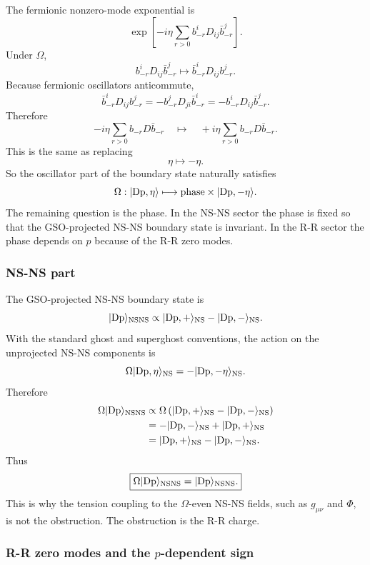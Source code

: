 \documentclass[
  10pt,
  a4paper,
  openany]{book}
\begin{document}
The fermionic nonzero-mode exponential is \[
\exp\left[
-i\eta
\sum_{r>0}
b_{-r}^iD_{ij}\bar b_{-r}^j
\right].
\] Under \(\Omega\), \[
b_{-r}^iD_{ij}\bar b_{-r}^j
\longmapsto
\bar b_{-r}^iD_{ij}b_{-r}^j.
\] Because fermionic oscillators anticommute, \[
\bar b_{-r}^iD_{ij}b_{-r}^j
=
-
b_{-r}^jD_{ji}\bar b_{-r}^i
=
-
b_{-r}^iD_{ij}\bar b_{-r}^j.
\] Therefore \[
-i\eta
\sum_{r>0}
b_{-r}D\bar b_{-r}
\quad
\longmapsto
\quad
+i\eta
\sum_{r>0}
b_{-r}D\bar b_{-r}.
\] This is the same as replacing \[
\eta\mapsto -\eta.
\] So the oscillator part of the boundary state naturally satisfies \[
\Omega:
|{\rm Dp},\eta\rangle
\longmapsto
\text{phase}\times
|{\rm Dp},-\eta\rangle.
\] The remaining question is the phase. In the NS-NS sector the phase is
fixed so that the GSO-projected NS-NS boundary state is invariant. In
the R-R sector the phase depends on \(p\) because of the R-R zero modes.

\subsubsection{NS-NS part}\label{ns-ns-part}

The GSO-projected NS-NS boundary state is \[
|{\rm Dp}\rangle_{\mathrm{NSNS}}
\propto
|{\rm Dp},+\rangle_{\mathrm{NS}}
-
|{\rm Dp},-\rangle_{\mathrm{NS}}.
\] With the standard ghost and superghost conventions, the action on the
unprojected NS-NS components is \[
\Omega |{\rm Dp},\eta\rangle_{\mathrm{NS}}
=
-
|{\rm Dp},-\eta\rangle_{\mathrm{NS}}.
\] Therefore \[
\begin{aligned}
\Omega |{\rm Dp}\rangle_{\mathrm{NSNS}}
&\propto
\Omega
\left(
|{\rm Dp},+\rangle_{\mathrm{NS}}
-
|{\rm Dp},-\rangle_{\mathrm{NS}}
\right)\\
&=
-
|{\rm Dp},-\rangle_{\mathrm{NS}}
+
|{\rm Dp},+\rangle_{\mathrm{NS}}\\
&=
|{\rm Dp},+\rangle_{\mathrm{NS}}
-
|{\rm Dp},-\rangle_{\mathrm{NS}}.
\end{aligned}
\] Thus \[
\boxed{
\Omega |{\rm Dp}\rangle_{\mathrm{NSNS}}
=
|{\rm Dp}\rangle_{\mathrm{NSNS}}.
}
\] This is why the tension coupling to the \(\Omega\)-even NS-NS fields,
such as \(g_{\mu\nu}\) and \(\Phi\), is not the obstruction. The
obstruction is the R-R charge.

\subsubsection{\texorpdfstring{R-R zero modes and the \(p\)-dependent
sign}{R-R zero modes and the p-dependent sign}}\label{r-r-zero-modes-and-the-p-dependent-sign}
\end{document}
